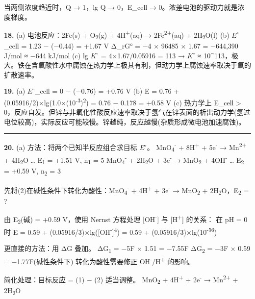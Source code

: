 \documentclass[a4paper,11pt]{ctexart}
\begin{document}
当两侧浓度趋近时，Q → 1，lg Q → 0，E\_cell → 0。浓差电池的驱动力就是浓度梯度。

\textbf{18.}
(a) 电池反应：2Fe(s) + O\textsubscript{2}(g) + 4H\textsuperscript{+}(aq) → 2Fe\textsuperscript{2+}(aq) + 2H\textsubscript{2}O(l)
(b) \(E^{\circ}\)\_cell = 1.23 − (−0.44) = +1.67 V
Δ\_rG° = −4 × 96485 × 1.67 = −644,390 J/mol ≈ −644 kJ/mol
(c) lg \(K^{\circ}\) = 4×1.67/0.05916 = 113 → \(K^{\circ}\) ≈ 10\^{}113，极大。铁在含氧酸性水中腐蚀在热力学上极其有利，但动力学上腐蚀速率取决于氧的扩散速率。

\textbf{19.}
(a) \(E^{\circ}\)\_cell = 0 − (−0.76) = +0.76 V
(b) E = 0.76 + (0.05916/2)×lg(1.0×(10\textsuperscript{-3})\textsuperscript{2}) = 0.76 − 0.178 = +0.58 V
(c) 热力学上 E\_cell \textgreater{} 0，反应自发。但锌与非氧化性酸反应速率取决于氢气在锌表面的析出动力学(氢过电位较高)，实际反应可能较慢。锌越纯，反应越慢(杂质形成微电池加速腐蚀)。

\begin{center}\rule{0.5\linewidth}{0.5pt}\end{center}

\textbf{20.}
(a) 方法：将两个已知半反应组合求目标 \(E^{\circ}\)。
MnO\textsubscript{4}\textsuperscript{-} + 8H\textsuperscript{+} + 5e\textsuperscript{-} → Mn\textsuperscript{2+} + 4H\textsubscript{2}O \ldots{} E\textsubscript{1} = +1.51 V, n\textsubscript{1} = 5
MnO\textsubscript{4}\textsuperscript{-} + 2H\textsubscript{2}O + 3e\textsuperscript{-} → MnO\textsubscript{2} + 4OH\textsuperscript{-} \ldots{} E\textsubscript{2} = +0.59 V, n\textsubscript{2} = 3

先将(2)在碱性条件下转化为酸性：MnO\textsubscript{4}\textsuperscript{-} + 4H\textsuperscript{+} + 3e\textsuperscript{-} → MnO\textsubscript{2} + 2H\textsubscript{2}O，E\textsubscript{2} = ?

由 E\textsubscript{2}(碱) = +0.59 V，使用 Nernst 方程处理 {[}OH\textsuperscript{-}{]} 与 {[}H\textsuperscript{+}{]} 的关系：
在 pH = 0 时 E = 0.59 + (0.05916/3)×lg({[}OH\textsuperscript{-}{]}\textsuperscript{4}) = 0.59 + (0.05916/3)×lg(10\textsuperscript{-56})

更直接的方法：用 ΔG 叠加。
ΔG\textsubscript{1} = −5F × 1.51 = −7.55F
ΔG\textsubscript{2} = −3F × 0.59 = −1.77F(碱性条件下)
转化为酸性需要修正 OH\textsuperscript{-}/H\textsuperscript{+} 的影响。

简化处理：目标反应 = (1) − (2) 适当调整。
MnO\textsubscript{2} + 4H\textsuperscript{+} + 2e\textsuperscript{-} → Mn\textsuperscript{2+} + 2H\textsubscript{2}O
\end{document}
